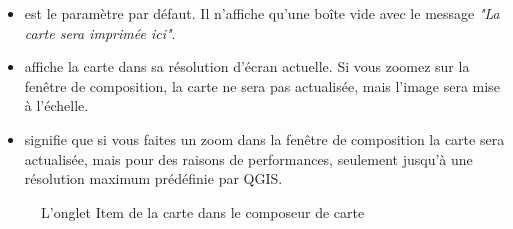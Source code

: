 \begin{itemize}
\item {} est le paramètre par défaut. Il n'affiche qu'une boîte vide avec le message \textit{"La carte sera imprimée ici"}. 
\item {} affiche la carte dans sa résolution d'écran actuelle. Si vous zoomez sur la fenêtre de composition, la carte ne sera pas actualisée, mais l'image sera mise à l'échelle.
\item {} signifie que si vous faites un zoom dans la fenêtre de composition la carte sera actualisée, mais pour des raisons de performances, seulement jusqu'à une résolution maximum prédéfinie par QGIS.
\end{itemize}

\begin{figure}[ht]
\centering
\caption{L'onglet Item de la carte dans le composeur de carte
\nixcaption}\label{fig:print_composer_map_item}
   \goodgap
\end{figure}


